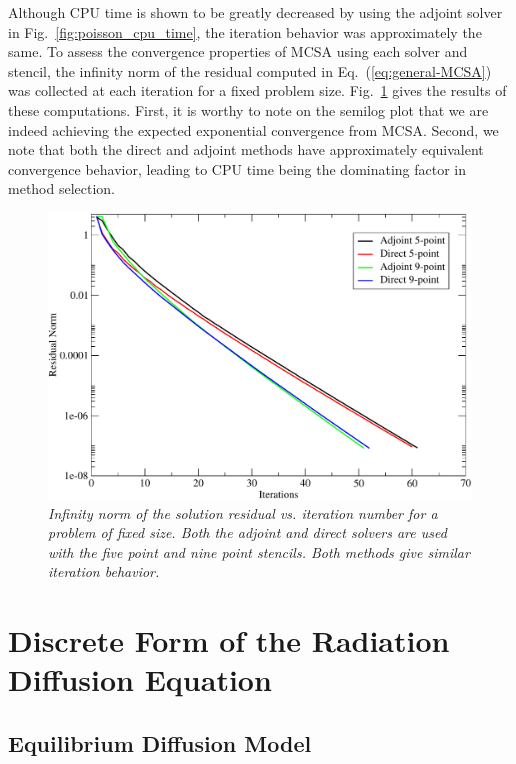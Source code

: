 \documentclass[preprint,12pt]{elsarticle}
\begin{document}
Although CPU time is shown to be greatly decreased by using the
adjoint solver in Fig.~\ref{fig:poisson_cpu_time}, the iteration
behavior was approximately the same. To assess the convergence
properties of MCSA using each solver and stencil, the infinity norm of
the residual computed in Eq.~(\ref{eq:general-MCSA}) was collected at
each iteration for a fixed problem
size. Fig.~\ref{fig:poisson_convergence} gives the results of these
computations. First, it is worthy to note on the semilog plot that we
are indeed achieving the expected exponential convergence from
MCSA. Second, we note that both the direct and adjoint methods have
approximately equivalent convergence behavior, leading to CPU time
being the dominating factor in method selection.

\begin{figure}[htpb!]
  \centering
  \includegraphics[width=5in,clip]{Adjoint_Direct_Convergence.pdf}
  \caption{\sl Infinity norm of the solution residual vs. iteration
    number for a problem of fixed size. Both the adjoint and direct
    solvers are used with the five point and nine point stencils. Both
    methods give similar iteration behavior.}
  \label{fig:poisson_convergence}
\end{figure}

\section{Discrete Form of the Radiation Diffusion Equation}
\label{sec:discr-form-radi}

\subsection{Equilibrium Diffusion Model}
\end{document}
